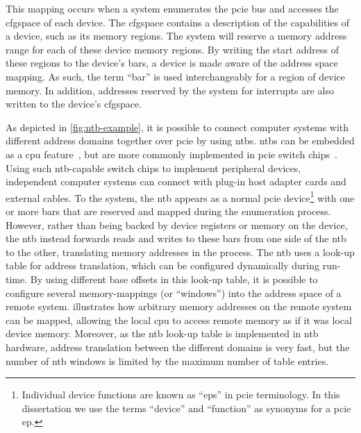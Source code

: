 This mapping occurs when a system enumerates the \gls{pcie} bus and accesses the \gls{cfgspace} of each device.
%
The \gls{cfgspace} contains a description of the capabilities of a device, such as its memory regions.
%
The system will reserve a memory address range for each of these device memory regions.
%
By writing the start address of these regions to the device's \glspl{bar}, a device is made aware of the address space mapping.
%
As such, the term ``\gls{bar}'' is used interchangeably for a region of device memory.
%
In addition, addresses reserved by the system for interrupts are also written to the device's \gls{cfgspace}.




As depicted in \cref{fig:ntb-example}, it is possible to connect computer systems with different address domains together over \gls{pcie} by using \glspl{ntb}.
%
\Glspl{ntb} can be embedded as a \gls{cpu} feature~\cite{whitepaper:Sullivan2010,url:LinuxNTB-AMD}, but are more commonly implemented in \gls{pcie} switch chips~\cite{whitepaper:PLX,pex8733}.
%
Using such \gls{ntb}-capable switch chips to implement peripheral devices, independent computer systems can connect with plug-in host adapter cards and external cables.
%
To the system, the \gls{ntb} appears as a normal \gls{pcie} device\footnote{Individual device functions are known as ``\glspl{ep}'' in \gls{pcie} terminology. In this dissertation we use the terms ``device'' and ``function'' as synonyms for a \gls{pcie} \gls{ep}.} with one or more \glspl{bar} that are reserved and mapped during the enumeration process.
%
However, rather than being backed by device registers or memory on the device, the \gls{ntb} instead forwards reads and writes to these \glspl{bar} from one side of the \gls{ntb} to the other, translating memory addresses in the process.
%
The \gls{ntb} uses a look-up table for address translation, which can be configured dynamically during run-time.
%
By using different base offsets in this look-up table, it is possible to configure several memory-mappings (or ``windows'') into the address space of a remote system.
%
 illustrates how arbitrary memory addresses on the remote system can be mapped, allowing the local \gls{cpu} to access remote memory as if it was local device memory.
%
Moreover, as the \gls{ntb} look-up table is implemented in \gls{ntb} hardware, address translation between the different domains is very fast, but the number of \gls{ntb} windows is limited by the maximum number of table entries.



